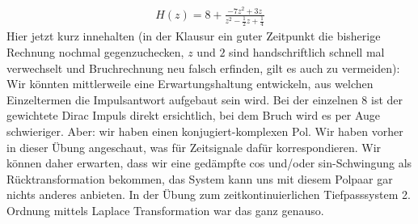 \begin{Loesung}
\begin{align}
H(z) = 8 + \frac{-7 z^2 + 3 z}{z^2-\frac{1}{2}z +\frac{1}{4}}
\end{align}
Hier jetzt kurz innehalten (in der Klausur ein guter Zeitpunkt die bisherige
Rechnung nochmal gegenzuchecken, $z$ und $2$ sind handschriftlich schnell mal
verwechselt und Bruchrechnung neu falsch erfinden, gilt es auch zu
vermeiden):
Wir könnten mittlerweile eine Erwartungshaltung entwickeln, aus welchen Einzeltermen
die Impulsantwort aufgebaut sein wird. Bei der einzelnen 8 ist der gewichtete
Dirac Impuls direkt ersichtlich, bei dem Bruch wird es per Auge schwieriger.
Aber: wir haben einen konjugiert-komplexen Pol. Wir haben vorher in dieser Übung
angeschaut, was für Zeitsignale dafür korrespondieren.
Wir können daher erwarten, dass wir eine gedämpfte cos und/oder sin-Schwingung
als Rücktransformation bekommen, das System kann uns mit diesem Polpaar gar nichts
anderes anbieten. In der Übung zum zeitkontinuierlichen Tiefpasssystem
2. Ordnung mittels Laplace Transformation war das ganz genauso.


\end{Loesung}
